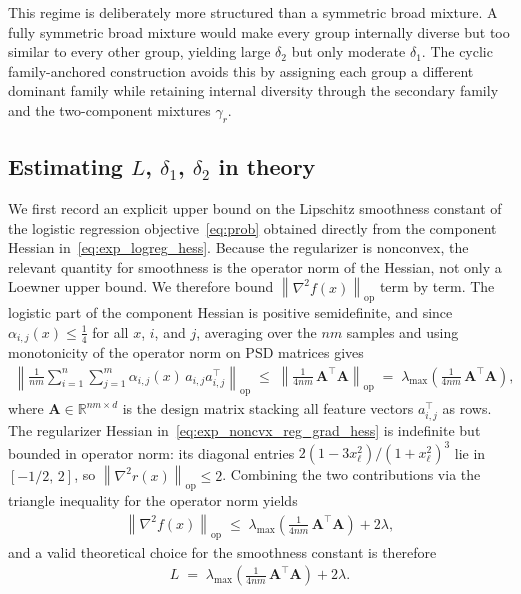 \documentclass{article}
\newcommand{\bb}{\mathbb}
\newcommand{\op}{\operatorname{op}}
\newcommand{\R}{\bb R}
\newcommand{\opnorm}[1]{\left\| #1 \right\|_{\op}}      %
\newcommand{\rb}[1]{\left(#1\right)}
\theoremstyle{plain}
\begin{document}
This regime is deliberately more structured than a symmetric broad mixture. A fully symmetric broad mixture would make every group internally diverse but too similar to every other group, yielding large $\delta_2$ but only moderate $\delta_1$. The cyclic family-anchored construction avoids this by assigning each group a different dominant family while retaining internal diversity through the secondary family and the two-component mixtures $\gamma_r$.



\subsection{Estimating $L$, $\delta_1$, $\delta_2$ in theory}
\label{sec:exp_estimating_deltas_theory}

We first record an explicit upper bound on the Lipschitz smoothness constant of the logistic regression objective~\eqref{eq:prob} obtained directly from the component Hessian in~\eqref{eq:exp_logreg_hess}. Because the regularizer is nonconvex, the relevant quantity for smoothness is the operator norm of the Hessian, not only a Loewner upper bound. We therefore bound $\opnorm{\nabla^2 f(x)}$ term by term. The logistic part of the component Hessian is positive semidefinite, and since $\alpha_{i,j}(x)\le \tfrac{1}{4}$ for all $x$, $i$, and $j$, averaging over the $nm$ samples and using monotonicity of the operator norm on PSD matrices gives
\begin{align*}
\opnorm{\frac{1}{nm}\sum_{i=1}^n\sum_{j=1}^m \alpha_{i,j}(x)\,a_{i,j}a_{i,j}^\top}
\;\le\;
\opnorm{\frac{1}{4nm}\,\mathbf{A}^\top \mathbf{A}}
\;=\;
\lambda_{\max}\!\rb{\frac{1}{4nm}\,\mathbf{A}^\top \mathbf{A}},
\end{align*}
where $\mathbf{A}\in\R^{nm\times d}$ is the design matrix stacking all feature vectors $a_{i,j}^\top$ as rows. The regularizer Hessian in~\eqref{eq:exp_noncvx_reg_grad_hess} is indefinite but bounded in operator norm: its diagonal entries $2(1-3x_\ell^2)/(1+x_\ell^2)^3$ lie in $[-1/2,\,2]$, so $\opnorm{\nabla^2 r(x)}\le 2$. Combining the two contributions via the triangle inequality for the operator norm yields
\begin{align*}
\opnorm{\nabla^2 f(x)}
\;\le\;
\lambda_{\max}\!\rb{\frac{1}{4nm}\,\mathbf{A}^\top \mathbf{A}}
+ 2\lambda,
\end{align*}
and a valid theoretical choice for the smoothness constant is therefore
\begin{align*}
L \;=\; \lambda_{\max}\!\rb{\frac{1}{4nm}\,\mathbf{A}^\top \mathbf{A}} + 2\lambda.
\end{align*}
\end{document}
